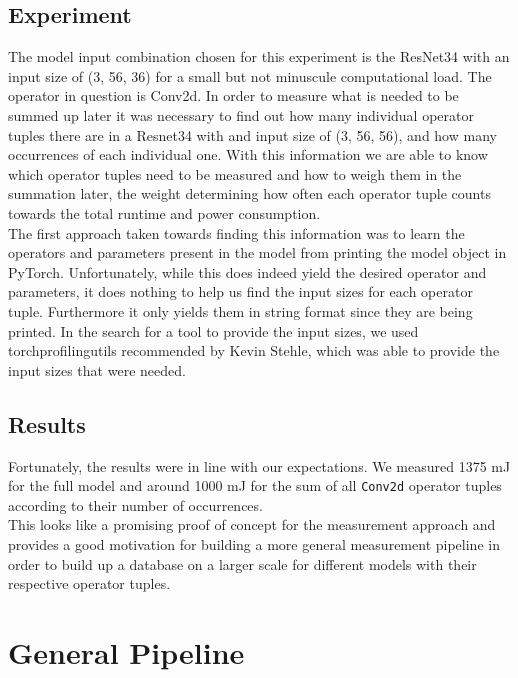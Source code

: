 \documentclass[conference]{IEEEtran}
\begin{document}
\subsection{Experiment}
The model input combination chosen for this experiment is the ResNet34 with an input size of (3, 56, 36) for a small but not minuscule computational load. The operator in question is Conv2d. In order to measure what is needed to be summed up later it was necessary to find out how many individual operator tuples there are in a Resnet34 with and input size of (3, 56, 56), and how many occurrences of each individual one. With this information we are able to know which operator tuples need to be measured and how to weigh them in the summation later, the weight determining how often each operator tuple counts towards the total runtime and power consumption. \\
The first approach taken towards finding this information was to learn the operators and parameters present in the model from printing the model object in PyTorch. Unfortunately, while this does indeed yield the desired operator and parameters, it does nothing to help us find the input sizes for each operator tuple. Furthermore it only yields them in string format since they are being printed. In the search for a tool to provide the input sizes, we used torchprofilingutils recommended by Kevin Stehle, which was able to provide the input sizes that were needed.

\subsection{Results}
    Fortunately, the results were in line with our expectations. We measured 1375 mJ for the full model and around 1000 mJ for the sum of all \texttt{Conv2d} operator tuples according to their number of occurrences. \\
This looks like a promising proof of concept for the measurement approach and provides a good motivation for building a more general measurement pipeline in order to build up a database on a larger scale for different models with their respective operator tuples. 

\section{General Pipeline}
\end{document}
